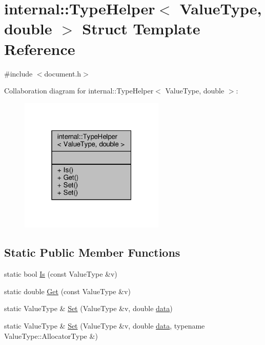 \hypertarget{structinternal_1_1TypeHelper_3_01ValueType_00_01double_01_4}{}\section{internal\+:\+:Type\+Helper$<$ Value\+Type, double $>$ Struct Template Reference}
\label{structinternal_1_1TypeHelper_3_01ValueType_00_01double_01_4}


{\ttfamily \#include $<$document.\+h$>$}



Collaboration diagram for internal\+:\+:Type\+Helper$<$ Value\+Type, double $>$\+:
\nopagebreak
\begin{figure}[H]
\begin{center}
\leavevmode
\includegraphics[width=196pt]{structinternal_1_1TypeHelper_3_01ValueType_00_01double_01_4__coll__graph}
\end{center}
\end{figure}
\subsection*{Static Public Member Functions}
\begin{DoxyCompactItemize}
\item 
static bool \hyperlink{structinternal_1_1TypeHelper_3_01ValueType_00_01double_01_4_a6c265a3202beb9bd85ecc7896a8ab9dd}{Is} (const Value\+Type \&v)
\item 
static double \hyperlink{structinternal_1_1TypeHelper_3_01ValueType_00_01double_01_4_ac55a96d2abd1dd6718a6cb3d6690aa38}{Get} (const Value\+Type \&v)
\item 
static Value\+Type \& \hyperlink{structinternal_1_1TypeHelper_3_01ValueType_00_01double_01_4_a2b332dd6083278283289e107caff879b}{Set} (Value\+Type \&v, double \hyperlink{imgui__impl__opengl3__loader_8h_abd87654504355b4c1bb002dcb1d4d16a}{data})
\item 
static Value\+Type \& \hyperlink{structinternal_1_1TypeHelper_3_01ValueType_00_01double_01_4_a69f7d942a569f3acdeb64127b2ecd9eb}{Set} (Value\+Type \&v, double \hyperlink{imgui__impl__opengl3__loader_8h_abd87654504355b4c1bb002dcb1d4d16a}{data}, typename Value\+Type\+::\+Allocator\+Type \&)
\end{DoxyCompactItemize}


